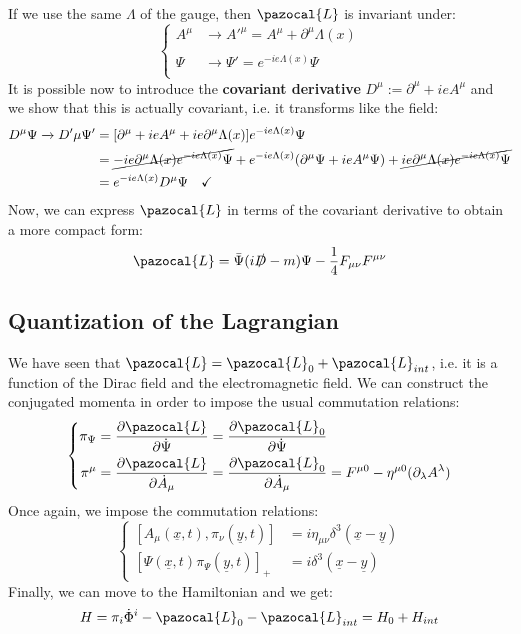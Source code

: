 \documentclass[../main.tex]{subfiles}
\begin{document}
If we use the same $\Lambda$ of the gauge, then $\pazocal{L}$ is invariant under:
\[
\left\{
\begin{aligned}
A^\mu&\xrightarrow[]{}A'^\mu=A^\mu+\partial^\mu\Lambda(x)\\
\Psi&\xrightarrow[]{}\Psi'=e^{-ie\Lambda(x)}\Psi
\end{aligned}
\right.
\]
It is possible now to introduce the \textbf{covariant derivative} $D^\mu:=\partial^\mu+ieA^\mu$ and we show that this is actually covariant, i.e. it transforms like the field:
\begin{align*}
D^\mu\Psi\xrightarrow[]{}D'\mu\Psi'&=[\partial^\mu+ieA^\mu+ie\partial^\mu\Lambda(x)]e^{-ie\Lambda(x)}\Psi\\
&=\cancel{-ie\partial^\mu\Lambda(x)e^{-ie\Lambda(x)}\Psi}+e^{-ie\Lambda(x)}(\partial^\mu\Psi+ieA^\mu\Psi)+\cancel{ie\partial^\mu\Lambda(x)e^{-ie\Lambda(x)}\Psi}\\
&=e^{-ie\Lambda(x)}D^\mu\Psi \quad \checkmark
\end{align*}
Now, we can express $\pazocal{L}$ in terms of the covariant derivative to obtain a more compact form:
\[
\pazocal{L}=\bar{\Psi}(i\slashed{D}-m)\Psi-\frac{1}{4}F_{\mu\nu}F^{\mu\nu}
\]
\subsection{Quantization of the Lagrangian}
We have seen that $\pazocal{L}=\pazocal{L}_0+\pazocal{L}_{int}$, i.e. it is a function of the Dirac field and the electromagnetic field. We can construct the conjugated momenta in order to impose the usual commutation relations:
\[
\left\{
\begin{aligned}
\pi_\Psi&=\frac{\partial\pazocal{L}}{\partial\Dot{\Psi}}=\frac{\partial\pazocal{L}_0}{\partial\Dot{\Psi}}\\
\pi^\mu&=\frac{\partial\pazocal{L}}{\partial\Dot{A}_\mu}=\frac{\partial\pazocal{L}_0}{\partial\Dot{A}_\mu}=F^{\mu0}-\eta^{\mu0}(\partial_\lambda A^\lambda)
\end{aligned}
\right.
\]
Once again, we impose the commutation relations:
\[
\left\{
\begin{aligned}
[A_\mu(\underline{x},t),\pi_\nu(\underline{y},t)]&=i\eta_{\mu\nu}\delta^3(\underline{x}-\underline{y})\\
[\Psi(\underline{x},t)\pi_\Psi(\underline{y},t)]_+&=i\delta^3(\underline{x}-\underline{y})
\end{aligned}
\right.
\]
Finally, we can move to the Hamiltonian and we get:
\[
H=\pi_i\Dot{\Phi}^i-\pazocal{L}_0-\pazocal{L}_{int}=H_0+H_{int}
\]
\end{document}
